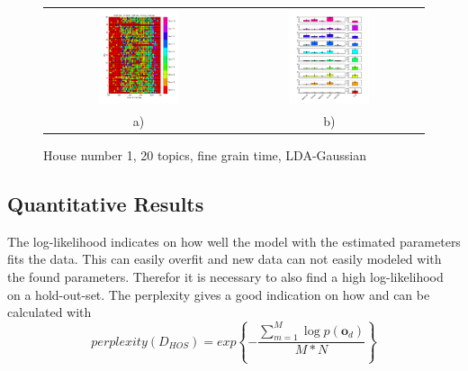 \begin{figure}
 \centering
 \begin{tabular}{c c}
  \includegraphics[width=0.45\textwidth]{Pictures/Gaus/fine/DayHN1TS48k20fine.png}
  &
  \includegraphics[width=0.45\textwidth]{Pictures/Gaus/fine/TopHN1TS48k20fine.png}\\
  a) & b)
 \end{tabular}
  \caption{House number 1, 20 topics, fine grain time, LDA-Gaussian}
  \label{fig:HN1Gaus20fine}
\end{figure}

\pagebreak

\subsection{Quantitative Results}
The log-likelihood indicates on how well the model with the estimated parameters fits the data. This can easily overfit and new data can not easily modeled with the found parameters. Therefor it is necessary to also find a high log-likelihood on a hold-out-set. The perplexity gives a good indication on how and can be calculated with
\begin{equation}
 perplexity(D_{HOS}) = exp \left\{ - \frac{\sum_{m=1}^M \log p(\textbf{o}_d ) }{M*N} \right\}
\end{equation}

